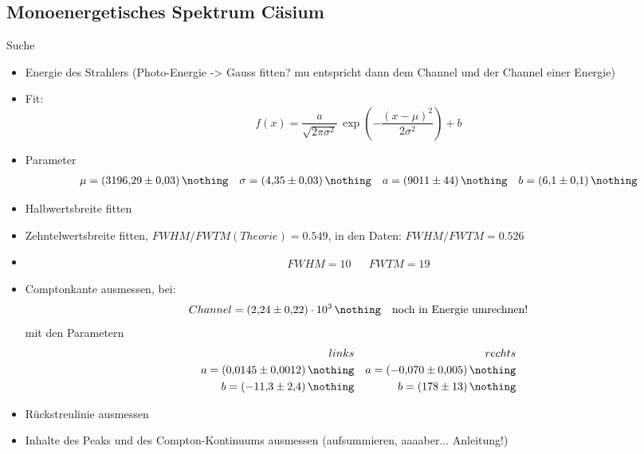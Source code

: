 \FloatBarrier
\subsection{Monoenergetisches Spektrum Cäsium}
Suche
\begin{itemize}
	\item Energie des Strahlers (Photo-Energie -> Gauss fitten? mu entspricht dann dem Channel und der Channel einer Energie)
	\item Fit:
	\begin{equation*}
		f(x) = \frac{a}{\sqrt{2 \pi \sigma^2}} \, \exp{\left( - \frac{(x-\mu)^2}{2 \sigma^2} \right)} + b
	\end{equation*}
	\item Parameter
	\begin{align*}
		\mu = \SI{3196.29 (3)}{\nothing} && \sigma = \SI{4.35 (3)}{\nothing} && a = \SI{9011 (44)}{\nothing} && b = \SI{6.1 (1)}{\nothing}
	\end{align*}
	\item Halbwertsbreite fitten
	\item Zehntelwertsbreite fitten, $FWHM/FWTM(Theorie) = 0.549$, in den Daten: $FWHM/FWTM = 0.526$
	\item
	\begin{align*}
		FWHM = 10 && FWTM = 19
	\end{align*}
	\item Comptonkante ausmessen, bei:
	\begin{align*}
		Channel = \SI{2.24 (22)e+03}{\nothing} \quad \text{noch in Energie umrechnen!}
	\end{align*}
	mit den Parametern
	\begin{align*}
		links   && rechts \\
		a = \SI{0.0145 (12)}{\nothing} && a = \SI{ -0.070 (5)}{\nothing} \\
		b = \SI{ -11.3 (24)}{\nothing} && b = \SI{ 178 (13)}{\nothing} \\
	\end{align*}
	\item Rückstreulinie ausmessen
	\item Inhalte des Peaks und des Compton-Kontinuums ausmessen (aufsummieren, aaaaber... Anleitung!)
\end{itemize}
